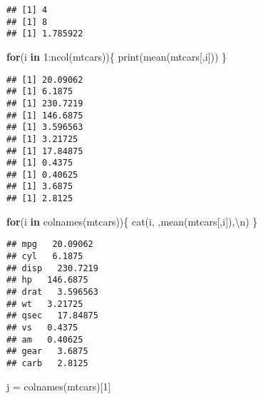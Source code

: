 \documentclass[]{article}
\newenvironment{Shaded}{\begin{snugshade}}{\end{snugshade}}
\newcommand{\ControlFlowTok}[1]{\textcolor[rgb]{0.13,0.29,0.53}{\textbf{#1}}}
\newcommand{\DecValTok}[1]{\textcolor[rgb]{0.00,0.00,0.81}{#1}}
\newcommand{\FunctionTok}[1]{\textcolor[rgb]{0.00,0.00,0.00}{#1}}
\newcommand{\NormalTok}[1]{#1}
\newcommand{\OtherTok}[1]{\textcolor[rgb]{0.56,0.35,0.01}{#1}}
\newcommand{\SpecialCharTok}[1]{\textcolor[rgb]{0.00,0.00,0.00}{#1}}
\newcommand{\StringTok}[1]{\textcolor[rgb]{0.31,0.60,0.02}{#1}}
\begin{document}
\begin{Shaded}
\end{Shaded}

\begin{verbatim}
## [1] 4
## [1] 8
## [1] 1.785922
\end{verbatim}

\begin{Shaded}
\begin{Highlighting}[]
\ControlFlowTok{for}\NormalTok{(i }\ControlFlowTok{in} \DecValTok{1}\SpecialCharTok{:}\FunctionTok{ncol}\NormalTok{(mtcars))\{}
  \FunctionTok{print}\NormalTok{(}\FunctionTok{mean}\NormalTok{(mtcars[,i]))}
\NormalTok{\}}
\end{Highlighting}
\end{Shaded}

\begin{verbatim}
## [1] 20.09062
## [1] 6.1875
## [1] 230.7219
## [1] 146.6875
## [1] 3.596563
## [1] 3.21725
## [1] 17.84875
## [1] 0.4375
## [1] 0.40625
## [1] 3.6875
## [1] 2.8125
\end{verbatim}

\begin{Shaded}
\begin{Highlighting}[]
\ControlFlowTok{for}\NormalTok{(i }\ControlFlowTok{in} \FunctionTok{colnames}\NormalTok{(mtcars))\{}
  \FunctionTok{cat}\NormalTok{(i,}\StringTok{\textquotesingle{} \textquotesingle{}}\NormalTok{,}\FunctionTok{mean}\NormalTok{(mtcars[,i]),}\StringTok{\textquotesingle{}}\SpecialCharTok{\textbackslash{}n}\StringTok{\textquotesingle{}}\NormalTok{)}
\NormalTok{\}}
\end{Highlighting}
\end{Shaded}

\begin{verbatim}
## mpg   20.09062 
## cyl   6.1875 
## disp   230.7219 
## hp   146.6875 
## drat   3.596563 
## wt   3.21725 
## qsec   17.84875 
## vs   0.4375 
## am   0.40625 
## gear   3.6875 
## carb   2.8125
\end{verbatim}

\begin{Shaded}
\begin{Highlighting}[]
\NormalTok{j }\OtherTok{=} \FunctionTok{colnames}\NormalTok{(mtcars)[}\DecValTok{1}\NormalTok{]}
\end{Highlighting}
\end{Shaded}
\end{document}
